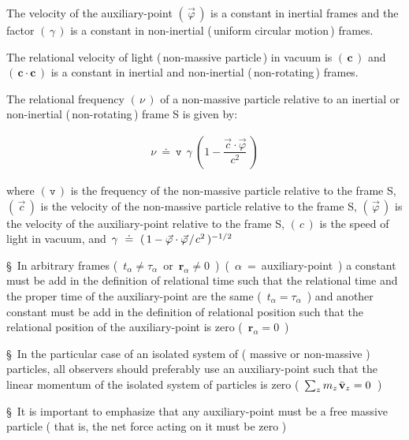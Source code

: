 \documentclass[10pt,fleqn]{article}
\begin{document}
\par \medskip \smallskip
\noindent The velocity of the auxiliary-point $( \, \vec{\varphi} \, )$ is a constant in inertial frames and the factor $( \, \gamma \, )$ is a constant in non-inertial (\,uniform circular motion\,) frames.
\par \medskip \smallskip
\noindent The relational velocity of light (\,non-massive particle\,) in vacuum is $( \, \mathbf{c} \, )$ and $( \, \mathbf{c} \cdot \mathbf{c} \, )$ is a constant in inertial and non-inertial (\,non-rotating\,) frames.
\par \medskip \smallskip
\noindent The relational frequency $( \, \nu \, )$ of a non-massive particle relative to an inertial or non-inertial (\,non-rotating\,) frame S is given by:
\par \vspace{-0.18em}
\begin{eqnarray*}
\nu ~\doteq~ \mathtt{v} \;\, \gamma \: \left ( 1 - \dfrac{\vec{c} \cdot \vec{\varphi}}{c^2} \: \right )
\end{eqnarray*}
\par \vspace{+0.90em}
\noindent where $( \, \mathtt{v} \, )$ is the frequency of the non-massive particle relative to the frame S, $( \, \vec{c} \, )$ is the velocity of the non-massive particle relative to the frame S, $( \, \vec{\varphi} \, )$ is the velocity of the auxiliary-point relative to the frame S, $( \, c \, )$ is the speed of light in vacuum, and {\small $\, \gamma ~\doteq~ (\,{1 - \vec{\varphi} \cdot \vec{\varphi}\hspace{+0.09em}/\hspace{+0.09em}c^2}\,)^{-1/2}$}

\newpage

\noindent \S \ In arbitrary frames \hbox {{\small ( $t_{\alpha} \ne \tau_{\alpha}$ or \hspace{+0.06em}$\mathbf{r}_{\alpha} \ne 0$ ) ( $\alpha$ = auxiliary-point )}} a constant must be add in the definition of relational time such that the relational time and the proper time of the auxiliary-point are the same \hbox {{\small ( $t_{\alpha} = \tau_{\alpha}$ )}} and another \hbox {constant} must be add in the definition of relational position such that the relational \hbox {position} of the auxiliary-point is zero \hbox {{\small ( $\mathbf{r}_{\alpha} = 0$ )}}
\par \medskip \smallskip
\noindent \S \ In the particular case of an isolated system of ( massive or non-massive ) particles, all observers should preferably use an auxiliary-point such that the linear momentum of the isolated system of particles is zero \hbox {{\small ( $\sum_z m_z \hspace{+0.09em} \bar{\mathbf{v}}_z = 0$ )}}
\par \medskip \smallskip
\noindent \S \ It is important to emphasize that any auxiliary-point must be a free massive particle ( that is, the net force acting on it must be zero )
\end{document}
